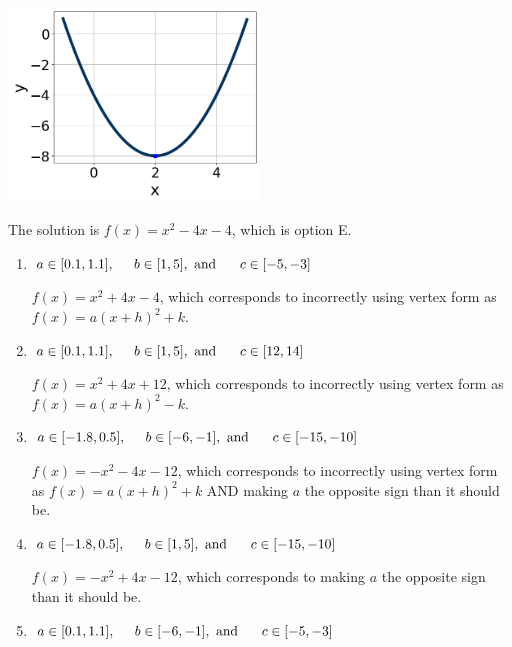\documentclass{extbook}[14pt]
\begin{document}
\begin{enumerate}
{\begin{center}
    \includegraphics[width=0.5\textwidth]{../Figures/quadraticGraphToEquationA.png}
\end{center}



The solution is \( f(x) = x^{2} -4 x -4 \), which is option E.\begin{enumerate}[label=\Alph*.]
\item \( a \in [0.1, 1.1], \hspace*{5mm} b \in [1, 5], \text{ and } \hspace*{5mm} c \in [-5, -3] \)

$f(x)=x^{2} +4 x -4$, which corresponds to incorrectly using vertex form as $f(x) = a(x+h)^2+k$.
\item \( a \in [0.1, 1.1], \hspace*{5mm} b \in [1, 5], \text{ and } \hspace*{5mm} c \in [12, 14] \)

$f(x)=x^{2} +4 x + 12$, which corresponds to incorrectly using vertex form as $f(x) = a(x+h)^2 - k$.
\item \( a \in [-1.8, 0.5], \hspace*{5mm} b \in [-6, -1], \text{ and } \hspace*{5mm} c \in [-15, -10] \)

$f(x)=-x^{2} -4 x -12$, which corresponds to incorrectly using vertex form as $f(x) = a(x+h)^2+k$ AND making $a$ the opposite sign than it should be.
\item \( a \in [-1.8, 0.5], \hspace*{5mm} b \in [1, 5], \text{ and } \hspace*{5mm} c \in [-15, -10] \)

$f(x)=-x^{2} +4 x -12$, which corresponds to making $a$ the opposite sign than it should be.
\item \( a \in [0.1, 1.1], \hspace*{5mm} b \in [-6, -1], \text{ and } \hspace*{5mm} c \in [-5, -3] \)


\end{enumerate}}
\end{enumerate}
\end{document}
